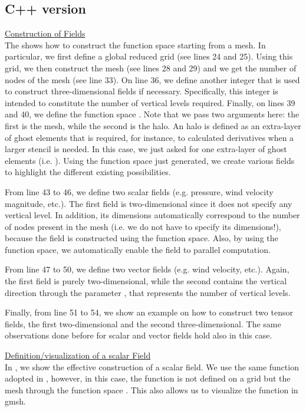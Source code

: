 \subsection{C++ version}
%
\begin{description}
%
\item \underline{Construction of Fields}\\[0.5em]
%
The  shows how to construct the function space 
 starting from a mesh. In particular, we first define 
a global reduced grid (see lines 24 and 25). Using this grid, we
then construct the mesh (see lines 28 and 29) and we get the number 
of nodes of the mesh (see line 33). On line 36, we define another 
integer that is used to construct three-dimensional fields if necessary. 
Specifically, this integer is intended to constitute the number of 
vertical levels required. 
Finally, on lines 39 and 40, we define the function space .
Note that we pass two arguments here: the first is the mesh, while the 
second is the halo. An halo is defined as an extra-layer of ghost elements
that is required, for instance, to calculated derivatives when a larger 
stencil is needed. In this case, we just asked for one extra-layer of 
ghost elements (i.e. ). 
Using the function space  just generated, we create 
various fields to highlight the different existing possibilities.

From line 43 to 46, we define two scalar fields (e.g. pressure, 
wind velocity magnitude, etc.). The first field is two-dimensional 
since it does not specify any vertical level. In addition, its 
dimensions automatically correspond to the number of nodes present 
in the mesh (i.e. we do not have to specify its dimensions!), because 
the field is constructed using the function space. Also, by using the 
function space, we automatically enable the field to parallel computation.

From line 47 to 50, we define two vector fields (e.g. wind velocity, etc.).
Again, the first field is purely two-dimensional, while the second contains 
the vertical direction through the parameter , that represents
the number of vertical levels. 

Finally, from line 51 to 54, we show an example on how to construct 
two tensor fields, the first two-dimensional and the second three-dimensional.
The same observations done before for scalar and vector fields hold 
also in this case.
%

%
%
\item \underline{Definition/visualization of a scalar Field}\\[0.5em]
%
%
In , we show the effective construction 
of a scalar field. We use the same function adopted in , 
however, in this case, the function is not defined on a grid but 
the mesh through the function space . This also allows 
us to visualize the function in gmsh.


\end{description}
